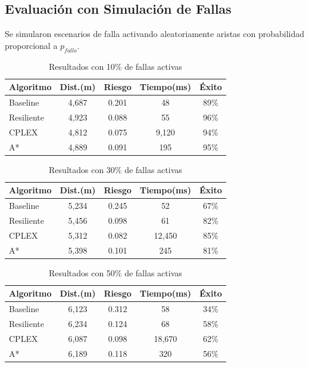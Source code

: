 \documentclass[conference]{IEEEtran}
\begin{document}
\subsection{Evaluación con Simulación de Fallas}

Se simularon escenarios de falla activando aleatoriamente aristas con probabilidad proporcional a $p_{fallo}$.

\begin{table}[!t]
\centering
\caption{Resultados con 10\% de fallas activas}
\begin{tabular}{@{}lcccc@{}}
\toprule
\textbf{Algoritmo} & \textbf{Dist.(m)} & \textbf{Riesgo} & \textbf{Tiempo(ms)} & \textbf{Éxito} \\
\midrule
Baseline & 4,687 & 0.201 & 48 & 89\% \\
Resiliente & 4,923 & 0.088 & 55 & 96\% \\
CPLEX & 4,812 & 0.075 & 9,120 & 94\% \\
A* & 4,889 & 0.091 & 195 & 95\% \\
\bottomrule
\end{tabular}
\end{table}

\begin{table}[!t]
\centering
\caption{Resultados con 30\% de fallas activas}
\begin{tabular}{@{}lcccc@{}}
\toprule
\textbf{Algoritmo} & \textbf{Dist.(m)} & \textbf{Riesgo} & \textbf{Tiempo(ms)} & \textbf{Éxito} \\
\midrule
Baseline & 5,234 & 0.245 & 52 & 67\% \\
Resiliente & 5,456 & 0.098 & 61 & 82\% \\
CPLEX & 5,312 & 0.082 & 12,450 & 85\% \\
A* & 5,398 & 0.101 & 245 & 81\% \\
\bottomrule
\end{tabular}
\end{table}

\begin{table}[!t]
\centering
\caption{Resultados con 50\% de fallas activas}
\begin{tabular}{@{}lcccc@{}}
\toprule
\textbf{Algoritmo} & \textbf{Dist.(m)} & \textbf{Riesgo} & \textbf{Tiempo(ms)} & \textbf{Éxito} \\
\midrule
Baseline & 6,123 & 0.312 & 58 & 34\% \\
Resiliente & 6,234 & 0.124 & 68 & 58\% \\
CPLEX & 6,087 & 0.098 & 18,670 & 62\% \\
A* & 6,189 & 0.118 & 320 & 56\% \\
\bottomrule
\end{tabular}
\end{table}
\end{document}
